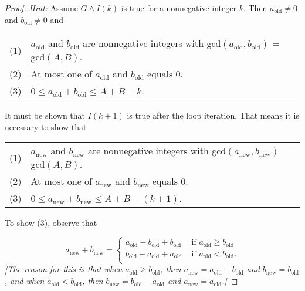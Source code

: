 \documentclass[14pt]{extarticle}
\begin{document}
\begin{proof}
    {\it Hint:} Assume $G \wedge I(k)$ is true for a nonnegative integer $k$. Then $a_{\text{old}} \neq 0$ and $b_{\text{old}} \neq 0$ and

    \begin{tabular}{ll}
        (1) & $a_{\text{old}}$ and $b_{\text{old}}$ are nonnegative integers with gcd$(a_{\text{old}}, b_{\text{old}})$ = gcd$(A, B)$. \\
        (2) & At most one of $a_{\text{old}}$ and $b_{\text{old}}$ equals 0.                                                           \\
        (3) & $0 \leq a_{\text{old}} + b_{\text{old}} \leq A + B - k$.
    \end{tabular}

    It must be shown that $I(k + 1)$ is true after the loop iteration. That means it is necessary to show that

    \begin{tabular}{ll}
        (1) & $a_{\text{new}}$ and $b_{\text{new}}$ are nonnegative integers with gcd$(a_{\text{new}}, b_{\text{new}})$ = gcd$(A, B)$. \\
        (2) & At most one of $a_{\text{new}}$ and $b_{\text{new}}$ equals 0.                                                           \\
        (3) & $0 \leq a_{\text{new}} + b_{\text{new}} \leq A + B - (k + 1)$.
    \end{tabular}

    To show (3), observe that

    \[
        a_{\text{new}} + b_{\text{new}} =
        \left\{
        \begin{array}{lr}
            a_{\text{old}} - b_{\text{old}} + b_{\text{old}} & \text{ if } a_{\text{old}} \geq b_{\text{old}} \\
            b_{\text{old}} - a_{\text{old}} + a_{\text{old}} & \text{ if } a_{\text{old}} < b_{\text{old}}.   \\
        \end{array}
        \right.
    \]
    {\it [The reason for this is that when $a_{\text{old}} \geq b_{\text{old}}$, then $a_{\text{new}} = a_{\text{old}} - b_{\text{old}}$ and $b_{\text{new}} = b_{\text{old}}$, and when $a_{\text{old}} < b_{\text{old}}$, then $b_{\text{new}} = b_{\text{old}} - a_{\text{old}}$ and $a_{\text{new}} = a_{\text{old}}$.]}


\end{proof}
\end{document}
